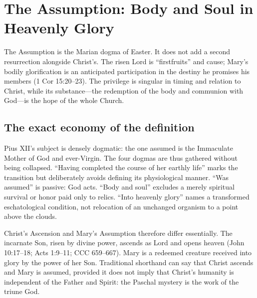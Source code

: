 \section{The Assumption: Body and Soul in Heavenly Glory}


The Assumption is the Marian dogma of Easter. It does not add a second resurrection alongside Christ's. The risen Lord is ``firstfruits'' and cause; Mary's bodily glorification is an anticipated participation in the destiny he promises his members (1 Cor 15:20--23). The privilege is singular in timing and relation to Christ, while its substance---the redemption of the body and communion with God---is the hope of the whole Church.

\subsection{The exact economy of the definition}

Pius XII's subject is densely dogmatic: the one assumed is the Immaculate Mother of God and ever-Virgin. The four dogmas are thus gathered without being collapsed. ``Having completed the course of her earthly life'' marks the transition but deliberately avoids defining its physiological manner. ``Was assumed'' is passive: God acts. ``Body and soul'' excludes a merely spiritual survival or honor paid only to relics. ``Into heavenly glory'' names a transformed eschatological condition, not relocation of an unchanged organism to a point above the clouds.

Christ's Ascension and Mary's Assumption therefore differ essentially. The incarnate Son, risen by divine power, ascends as Lord and opens heaven (John 10:17--18; Acts 1:9--11; CCC 659--667). Mary is a redeemed creature received into glory by the power of her Son. Traditional shorthand can say that Christ ascends and Mary is assumed, provided it does not imply that Christ's humanity is independent of the Father and Spirit: the Paschal mystery is the work of the triune God.

